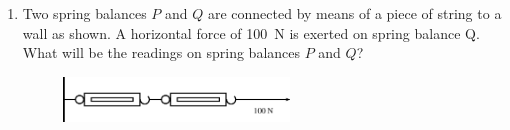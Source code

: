 \begin{enumerate}[noitemsep, label=\textbf{\arabic*}. ]
\begin{figure}[H]
\begin{center}
      \vspace{2pt}
    \vspace{.1in}
    
    \end{center}

 \end{figure}   

    \addtocounter{footnote}{-0}
            \label{m38819*uid91}\item Two spring balances \begin{math}P\end{math} and \begin{math}Q\end{math} are connected by means of a piece of string to a wall as shown. A horizontal force of 100~N is exerted on spring balance Q. What will be the readings on spring balances \begin{math}P\end{math} and \begin{math}Q\end{math}?

    \setcounter{subfigure}{0}


	\begin{figure}[H] %
    \begin{center}
    \label{m38819*id197535!!!underscore!!!media}\label{m38819*id197535!!!underscore!!!printimage}\includegraphics[width=6cm]{col11305.imgs/m38819_PG11C1_078.png} %
        
      \vspace{2pt}
    \vspace{.1in}
    
    \end{center}

 \end{figure}   

    \addtocounter{footnote}{-0}
    
    
      

\end{enumerate}
